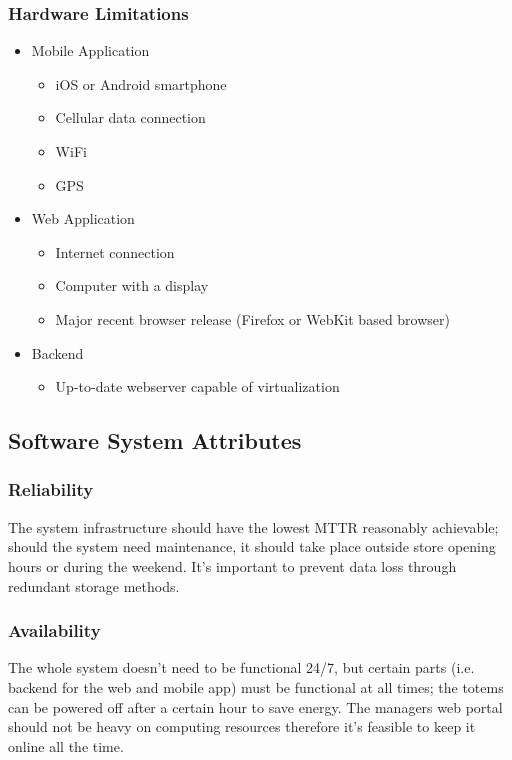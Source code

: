 \subsubsection{Hardware Limitations}
\begin{itemize}
    \item Mobile Application
    \begin{itemize}
        \item iOS or Android smartphone
        \item Cellular data connection
        \item WiFi
        \item GPS
    \end{itemize}
    \item Web Application
    \begin{itemize}
        \item Internet connection
        \item Computer with a display
        \item Major recent browser release (Firefox or WebKit based browser)
    \end{itemize}
    \item Backend
    \begin{itemize}
        \item Up-to-date webserver capable of virtualization
    \end{itemize}
\end{itemize}

\subsection{Software System Attributes}
\subsubsection{Reliability}
The system infrastructure should have the lowest MTTR reasonably achievable; should the system need maintenance, it should take place outside store opening hours or during the weekend. It's important to prevent data loss through redundant storage methods.

\subsubsection{Availability}
The whole system doesn't need to be functional 24/7, but certain parts (i.e. backend for the web and mobile app) must be functional at all times; the totems can be powered off after a certain hour to save energy. The managers web portal should not be heavy on computing resources therefore it's feasible to keep it online all the time.
